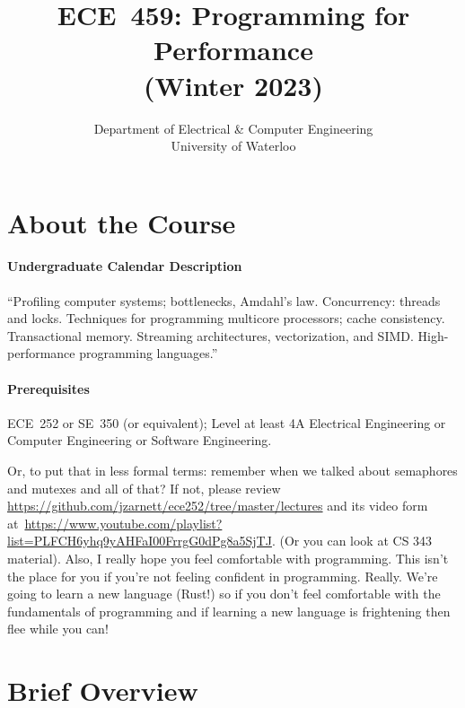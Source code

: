 
\date{}


\title{\bf\LARGE ECE~459: Programming for Performance\\ (Winter 2023)}
\author{Department of Electrical \& Computer Engineering \\
                University of Waterloo}
\renewcommand{\today}{}
\maketitle
\vspace*{-2em}

\section*{About the Course}

\paragraph{Undergraduate Calendar Description} ``Profiling computer systems; bottlenecks, Amdahl's law. Concurrency: threads and locks. Techniques for programming multicore processors; cache consistency. Transactional memory. Streaming architectures, vectorization, and SIMD. High-performance programming languages.''

\paragraph{Prerequisites} ECE~252 or SE~350 (or equivalent); Level at least 4A Electrical Engineering or Computer Engineering or Software Engineering.

Or, to put that in less formal terms: remember when we talked about semaphores and mutexes and all of that? If not, please review~ \url{https://github.com/jzarnett/ece252/tree/master/lectures} and its video form at~\url{https://www.youtube.com/playlist?list=PLFCH6yhq9yAHFaI00FrrgG0dPg8a5SjTJ}. (Or you can look at CS 343 material). Also, I really hope you feel comfortable with programming. This isn't the place for you if you're not feeling confident in programming. Really. We're going to learn a new language (Rust!) so if you don't feel comfortable with the fundamentals of programming and if learning a new language is frightening then flee while you can!

\section*{Brief Overview}

